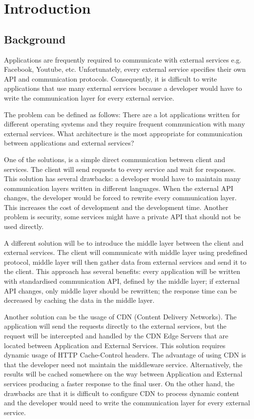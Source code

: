 \section{Introduction}

\subsection{Background}

Applications are frequently required to communicate with external services e.g. Facebook, Youtube, etc. Unfortunately, every external service specifies their own API and communication protocols. Consequently, it is difficult to write applications that use many external services because a developer would have to write the communication layer for every external service. 

The problem can be defined as follows:  There are a lot applications written for different operating systems and they require frequent communication with many external services. What architecture is the most appropriate for communication between applications and external services? 

One of the solutions, is a simple direct communication between client and services. The client will send requests to every service and wait for responses. This solution has several drawbacks: a developer would have to maintain many communication layers written in different languages. When the external API changes, the developer would be forced to rewrite every communication layer. This increases the cost of development and the development time. Another problem is security, some services might have a private API that should not be used directly.

A different solution will be to introduce the middle layer between the client and external services. The client will communicate with middle layer using predefined protocol, middle layer will then gather data from external services and send it to the client. This approach has several benefits: every application will be written with standardised communication API, defined by the middle layer; if external API changes, only middle layer should be rewritten; the response time can be decreased by caching the data in the middle layer. 

Another solution can be the usage of CDN (Content Delivery Networks). The application will send the requests directly to the external services, but the request will be intercepted and handled by the CDN Edge Servers that are located between Application and External Services. This solution requires dynamic usage of HTTP Cache-Control headers. The advantage of using CDN is that the developer need not maintain the middleware service. Alternatively, the results will be cached somewhere on the way between Application and External services producing a faster response to the final user. On the other hand, the drawbacks are that it is difficult to configure CDN to process dynamic content and the developer would need to write the communication layer for every external service. 

